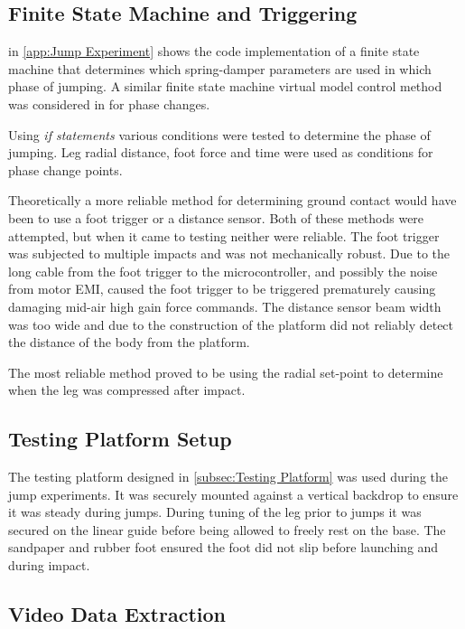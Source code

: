 \subsection{Finite State Machine and Triggering}

 in \cref{app:Jump Experiment} shows the code implementation of a finite state machine that determines which spring-damper parameters are used in which phase of jumping. A similar finite state machine virtual model control method was considered in \cite{Pratt2001} for phase changes.

Using \textit{if statements} various conditions were tested to determine the phase of jumping. Leg radial distance, foot force and time were used as conditions for phase change points. 

Theoretically a more reliable method for determining ground contact would have been to use a foot trigger or a distance sensor. Both of these methods were attempted, but when it came to testing neither were reliable. The foot trigger was subjected to multiple impacts and was not mechanically robust. Due to the long cable from the foot trigger to the microcontroller, and possibly the noise from motor EMI, caused the foot trigger to be triggered prematurely causing damaging mid-air high gain force commands. The distance sensor beam width was too wide and due to the construction of the platform did not reliably detect the distance of the body from the platform. 

The most reliable method proved to be using the radial set-point to determine when the leg was compressed after impact. 

\subsection{Testing Platform Setup}

The testing platform designed in \cref{subsec:Testing Platform} was used during the jump experiments. It was securely mounted against a vertical backdrop to ensure it was steady during jumps. During tuning of the leg prior to jumps it was secured on the linear guide before being allowed to freely rest on the base. The sandpaper and rubber foot ensured the foot did not slip before launching and during impact.

\subsection{Video Data Extraction}

